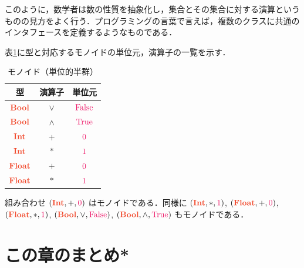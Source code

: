 \documentclass[a5paper,twoside,fleqn,draft]{jsbook}
\def\constantColor{WildStrawberry}
\def\typeColor{RedOrange}
\newcommand{\programminglanguage}[1]{\textsf{#1}}
\newcommand{\haskell}{\programminglanguage{Haskell}}
\newcommand{\code}[1]{\texttt{#1}}
\newcommand{\mConstant}[1]{\textcolor{\constantColor}{#1}}
\newcommand{\mSpecialConstant}[1]{\textcolor{\constantColor}{\textrm{#1}}}
\newcommand{\mZeroNumber}{{\mConstant{0}}}
\newcommand{\mOneNumber}{{\mConstant{1}}}
\newcommand{\mFalse}{\mSpecialConstant{False}}
\newcommand{\mTrue}{\mSpecialConstant{True}}
\newcommand{\mZero}{\mSpecialConstant{\O}}
\DeclareMathOperator{\mIn}{{:\!:}}
\DeclareMathOperator{\mLogicalAnd}{\wedge}
\DeclareMathOperator{\mLogicalOr}{\vee}
\DeclareMathOperator{\mPlus}{\bf{+}} %
\newcommand{\mType}[1]{\textcolor{\typeColor}{\mathbf{#1}}}
\newcommand{\mA}{\mType{a}}
\newcommand{\mBoolType}{\mType{Bool}}
\newcommand{\mFloatType}{\mType{Float}}
\newcommand{\mIntType}{\mType{Int}}
\newcommand{\mTupleWith}[1]{\left(#1\right)}
\newcommand{\mTypeClass}[1]{\textcolor{\typeColor}{\textbf{\textit{#1}}}}
\newcommand{\mMonoidTypeClass}{\mTypeClass{Monoid}}
\begin{document}
このように，数学者は数の性質を抽象化し，集合とその集合に対する演算というものの見方をよく行う．プログラミングの言葉で言えば，複数のクラスに共通のインタフェースを定義するようなものである．

表\ref{tab:monoids}に型と対応するモノイドの単位元，演算子の一覧を示す．

\begin{table}
\caption{モノイド（単位的半群）}
\label{tab:monoids}
\begin{center}
\begin{tabular}{||c||c|c||}
\hline 型&演算子&単位元\\\hline\hline
$\mBoolType$ &$\vee$&$\mFalse$\\\hline
$\mBoolType$ &$\wedge$ &$\mTrue$\\\hline\hline
$\mIntType$ &$+$ &$\mZeroNumber$\\\hline
$\mIntType$ &$*$ &$\mOneNumber$\\\hline\hline
$\mFloatType$ &$+$ &$\mZeroNumber$\\\hline
$\mFloatType$ &$*$ &$\mOneNumber$\\\hline
\end{tabular}
\end{center}
\end{table}

組み合わせ $(\mIntType,+,\mZeroNumber)$ はモノイドである．同様に $(\mIntType,*,\mOneNumber)$, $(\mFloatType,+,\mZeroNumber)$, $(\mFloatType,*,\mOneNumber)$, $(\mBoolType,\mLogicalOr,\mFalse)$, $(\mBoolType,\mLogicalAnd,\mTrue)$ もモノイドである．


\section{この章のまとめ*}
\end{document}
